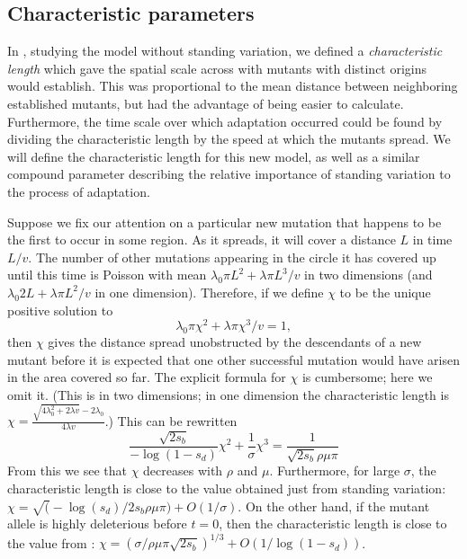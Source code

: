 \documentclass{article}
\begin{document}
\subsection{Characteristic parameters}


In \citet{ralphcoop2010}, studying the model without standing variation,
we defined a {\em characteristic length} which gave the spatial scale across with mutants with distinct origins would establish.
This was proportional to the mean distance between neighboring established mutants,
but had the advantage of being easier to calculate.
Furthermore, the time scale over which adaptation occurred could be found by dividing the characteristic length 
by the speed at which the mutants spread.
We will define the characteristic length for this new model,
as well as a similar compound parameter describing the relative importance of standing variation to the process of adaptation.

Suppose we fix our attention on a particular new mutation that happens to be the first to occur in some region.
As it spreads, it will cover a distance $L$ in time $L/v$.
The number of other mutations appearing in the circle it has covered up until this time is Poisson with mean
$\lambda_0 \pi L^2 + \lambda \pi L^3 /v$ in two dimensions
(and $\lambda_0 2 L + \lambda \pi L^2 /v$ in one dimension).
Therefore, if we define $\chi$ to be the unique positive solution to
\[
    \lambda_0 \pi \chi^2 + \lambda \pi \chi^3 /v = 1,
\]
then $\chi$ gives the distance spread unobstructed by the descendants of a new mutant
before it is expected that one other successful mutation would have arisen in the area covered so far.
The explicit formula for $\chi$ is cumbersome; here we omit it.
(This is in two dimensions; in one dimension the characteristic length is $\chi = \frac{ \sqrt{ 4 \lambda_0^2 + 2\lambda v } - 2 \lambda_0 }{ 4 \lambda v }$.)
This can be rewritten 
\begin{equation} \label{eqn:defines_chi}
   \frac{\sqrt{2s_b} }{-\log(1-s_d) } \chi^2 + \frac{1}{\sigma} \chi^3 = \frac{1}{\sqrt{2s_b} \rho\mu\pi}
\end{equation}
From this we see that $\chi$ decreases with $\rho$ and $\mu$.
Furthermore, for large $\sigma$, the characteristic length is close to the value obtained just from standing variation:
$\chi = \sqrt( -\log(s_d) / 2 s_b \rho \mu \pi ) + O(1/\sigma)$.
On the other hand, if the mutant allele is highly deleterious before $t=0$,
then the characteristic length is close to the value from \citet{ralphcoop2010}:
$\chi = ( \sigma / \rho \mu \pi \sqrt{2 s_b} )^{1/3} + O(1/\log(1-s_d))$.
\end{document}

